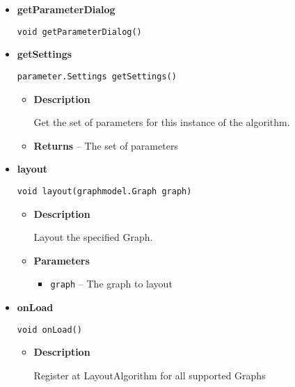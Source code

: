 {{{{{{{\begin{itemize}
{\begin{itemize}
{Get the full name of the layout.
}
\item{{\bf  Returns} -- 
The full name of the layout. 
}%
\end{itemize}
}%
\item{ 
{\bf  getParameterDialog}\\
\begin{lstlisting}[frame=none]
void getParameterDialog()\end{lstlisting} %
}%
\item{ 
{\bf  getSettings}\\
\begin{lstlisting}[frame=none]
parameter.Settings getSettings()\end{lstlisting} %
\begin{itemize}
\item{
{\bf  Description}

Get the set of parameters for this instance of the algorithm.
}
\item{{\bf  Returns} -- 
The set of parameters 
}%
\end{itemize}
}%
\item{ 
{\bf  layout}\\
\begin{lstlisting}[frame=none]
void layout(graphmodel.Graph graph)\end{lstlisting} %
\begin{itemize}
\item{
{\bf  Description}

Layout the specified Graph.
}
\item{
{\bf  Parameters}
  \begin{itemize}
   \item{
\texttt{graph} -- The graph to layout}
  \end{itemize}
}%
\end{itemize}
}%
\item{ 
{\bf  onLoad}\\
\begin{lstlisting}[frame=none]
void onLoad()\end{lstlisting} %
\begin{itemize}
\item{
{\bf  Description}

Register at LayoutAlgorithm for all supported Graphs
}
\end{itemize}
}%
\end{itemize}
}
}
}}}}}
